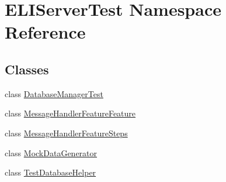 \hypertarget{namespace_e_l_i_server_test}{}\section{E\+L\+I\+Server\+Test Namespace Reference}
\label{namespace_e_l_i_server_test}
\subsection*{Classes}
\begin{DoxyCompactItemize}
\item 
class \hyperlink{class_e_l_i_server_test_1_1_database_manager_test}{Database\+Manager\+Test}
\item 
class \hyperlink{class_e_l_i_server_test_1_1_message_handler_feature_feature}{Message\+Handler\+Feature\+Feature}
\item 
class \hyperlink{class_e_l_i_server_test_1_1_message_handler_feature_steps}{Message\+Handler\+Feature\+Steps}
\item 
class \hyperlink{class_e_l_i_server_test_1_1_mock_data_generator}{Mock\+Data\+Generator}
\item 
class \hyperlink{class_e_l_i_server_test_1_1_test_database_helper}{Test\+Database\+Helper}
\end{DoxyCompactItemize}
